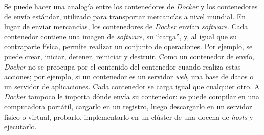 Se puede hacer una analogía entre los contenedores de \emph{Docker} y los contenedores 
de envío estándar, utilizado para transportar mercancías a nivel mundial. 
En lugar de enviar mercancías, los contenedores de \emph{Docker} envían \emph{software}. 
Cada contenedor contiene una imagen de \emph{software}, su “carga”, y, al igual 
que su contraparte física, permite realizar un conjunto de operaciones. 
Por ejemplo, se puede crear, iniciar, detener, reiniciar y destruir. Como 
un contenedor de envío, \emph{Docker} no se preocupa por el contenido del contenedor 
cuando realiza estas acciones; por ejemplo, si un contenedor es un servidor \emph{web}, 
una base de datos o un servidor de aplicaciones. Cada contenedor se carga 
igual que cualquier otro. A \emph{Docker} tampoco le importa dónde envía su contenedor: 
se puede compilar en una computadora portátil, cargarlo en un registro, luego 
descargarlo en un servidor físico o virtual, probarlo, implementarlo en un 
clúster de una docena de \emph{hosts} y ejecutarlo. 


